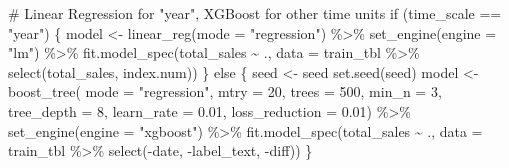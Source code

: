 \documentclass[
  11pt,
]{article}
\newenvironment{Shaded}{\begin{snugshade}}{\end{snugshade}}
\newcommand{\AttributeTok}[1]{\textcolor[rgb]{0.40,0.45,0.13}{#1}}
\newcommand{\CommentTok}[1]{\textcolor[rgb]{0.37,0.37,0.37}{#1}}
\newcommand{\ControlFlowTok}[1]{\textcolor[rgb]{0.00,0.23,0.31}{#1}}
\newcommand{\DecValTok}[1]{\textcolor[rgb]{0.68,0.00,0.00}{#1}}
\newcommand{\FloatTok}[1]{\textcolor[rgb]{0.68,0.00,0.00}{#1}}
\newcommand{\FunctionTok}[1]{\textcolor[rgb]{0.28,0.35,0.67}{#1}}
\newcommand{\NormalTok}[1]{\textcolor[rgb]{0.00,0.23,0.31}{#1}}
\newcommand{\OtherTok}[1]{\textcolor[rgb]{0.00,0.23,0.31}{#1}}
\newcommand{\SpecialCharTok}[1]{\textcolor[rgb]{0.37,0.37,0.37}{#1}}
\newcommand{\StringTok}[1]{\textcolor[rgb]{0.13,0.47,0.30}{#1}}
\begin{document}
\begin{Shaded}
\begin{Highlighting}[]
  \CommentTok{\# Linear Regression for "year", XGBoost for other time units}
  \ControlFlowTok{if}\NormalTok{ (time\_scale }\SpecialCharTok{==} \StringTok{"year"}\NormalTok{) \{}
\NormalTok{    model }\OtherTok{\textless{}{-}} \FunctionTok{linear\_reg}\NormalTok{(}\AttributeTok{mode =} \StringTok{"regression"}\NormalTok{) }\SpecialCharTok{\%\textgreater{}\%}
      \FunctionTok{set\_engine}\NormalTok{(}\AttributeTok{engine =} \StringTok{"lm"}\NormalTok{) }\SpecialCharTok{\%\textgreater{}\%}
      \FunctionTok{fit.model\_spec}\NormalTok{(total\_sales }\SpecialCharTok{\textasciitilde{}}\NormalTok{ ., }\AttributeTok{data =}\NormalTok{ train\_tbl }\SpecialCharTok{\%\textgreater{}\%} \FunctionTok{select}\NormalTok{(total\_sales, index.num))}
\NormalTok{  \} }\ControlFlowTok{else}\NormalTok{ \{}
\NormalTok{    seed }\OtherTok{\textless{}{-}}\NormalTok{ seed}
    \FunctionTok{set.seed}\NormalTok{(seed)}
\NormalTok{    model }\OtherTok{\textless{}{-}} \FunctionTok{boost\_tree}\NormalTok{(}
      \AttributeTok{mode =} \StringTok{"regression"}\NormalTok{,}
      \AttributeTok{mtry =} \DecValTok{20}\NormalTok{,}
      \AttributeTok{trees =} \DecValTok{500}\NormalTok{,}
      \AttributeTok{min\_n =} \DecValTok{3}\NormalTok{,}
      \AttributeTok{tree\_depth =} \DecValTok{8}\NormalTok{,}
      \AttributeTok{learn\_rate =} \FloatTok{0.01}\NormalTok{,}
      \AttributeTok{loss\_reduction =} \FloatTok{0.01}\NormalTok{) }\SpecialCharTok{\%\textgreater{}\%}
      \FunctionTok{set\_engine}\NormalTok{(}\AttributeTok{engine =} \StringTok{"xgboost"}\NormalTok{) }\SpecialCharTok{\%\textgreater{}\%}
      \FunctionTok{fit.model\_spec}\NormalTok{(total\_sales }\SpecialCharTok{\textasciitilde{}}\NormalTok{ ., }\AttributeTok{data =}\NormalTok{ train\_tbl }\SpecialCharTok{\%\textgreater{}\%} \FunctionTok{select}\NormalTok{(}\SpecialCharTok{{-}}\NormalTok{date, }\SpecialCharTok{{-}}\NormalTok{label\_text, }\SpecialCharTok{{-}}\NormalTok{diff))}
\NormalTok{  \}}


\end{Highlighting}
\end{Shaded}
\end{document}
